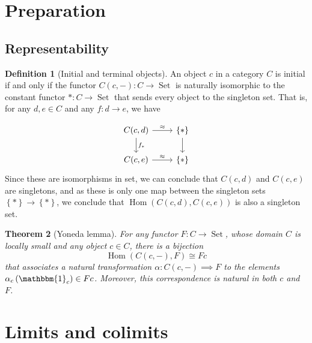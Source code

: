 \documentclass[reqno]{amsart}
\newtheorem{theorem}{Theorem}[section]
\theoremstyle{definition}
\newtheorem{definition}[theorem]{Definition}
\theoremstyle{remark}
\DeclareMathOperator{\Hom}{Hom}
\DeclareMathOperator{\Set}{Set}
\begin{document}
\section{Preparation}

\subsection{Representability}

\begin{definition}[Initial and terminal objects]
    An object $c$ in a category $C$ is initial if
    and only if the functor
    $C \left( c,- \right) \colon C \to \Set$ is
    naturally isomorphic to the constant functor
    $* \colon C \to \Set$ that sends every object to
    the singleton set.
    That is, for any $d,e \in C $ and any
    $f \colon d \to e$, we have
    
    \begin{equation*}
    \begin{tikzcd}
        C(c,d) \ar[d, "f_*"] \ar[r, "\approx"] & \left\{ * \right\} 
        \ar[d] \\
        C(c,e) \ar[r, "\approx"] & \left\{ * \right\} 
    \end{tikzcd}
    \end{equation*}
    Since these are isomorphisms in set,
    we can conclude that
    $C(c,d)$ and $C(c,e)$ are singletons, and
    as these is only one map between the singleton
    sets $\left\{ * \right\} \to \left\{ * \right\} $, we
    conclude that
    $\Hom \left( C(c,d), C(c,e) \right) $ is also
    a singleton set.
    
    
\end{definition}

\begin{theorem}[Yoneda lemma]
    For any functor $F \colon C \to \Set$, whose
    domain $C$ is locally small and any object
     $c \in C$, there is a bijection
     \[
     \Hom \left( C(c,-),F \right) \cong Fc
     \] 
     that associates a natural transformation
     $\alpha \colon C\left( c,- \right) \implies F$ to the
     elements $\alpha_{c}\left( \mathbbm{1}_c \right) 
     \in Fc$. Moreover, this correspondence is natural
     in both $c$ and $F$.
\end{theorem}


\section{Limits and colimits}
\end{document}
